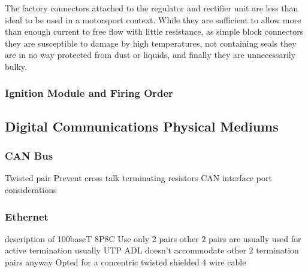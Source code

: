 The factory connectors attached to the regulator and rectifier unit are less than ideal to be used in a motorsport context.  While they are sufficient to allow more than enough current to free flow with little resistance, as simple block connectors they are susceptible to damage by high temperatures, not containing seals they are in no way protected from dust or liquids, and finally they are unnecessarily bulky.

\subsubsection{Ignition Module and Firing Order}

\subsection{Digital Communications Physical Mediums}

\subsubsection{CAN Bus}
Twisted pair
Prevent cross talk
terminating resistors
CAN interface port considerations

\subsubsection{Ethernet}
description of 100baseT
8P8C
Use only 2 pairs
other 2 pairs are usually used for active termination
usually UTP
ADL doesn't accommodate other 2 termination pairs anyway
Opted for a concentric twisted shielded 4 wire cable
